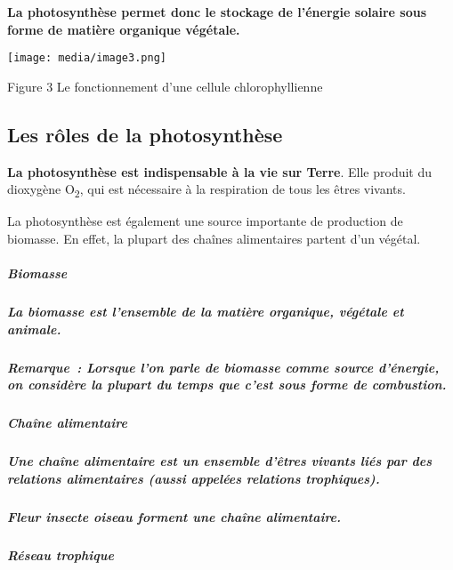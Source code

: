 \begin{itemize}
\textbf{La photosynthèse permet donc le stockage de l'énergie solaire
sous forme de matière organique végétale.}

\texttt{[image: media/image3.png]}

\protect\hypertarget{le-fonctionnement-dune-cellule-chlorophy}{}{}Figure
3 Le fonctionnement d'une cellule chlorophyllienne

\subsection{Les rôles de la
photosynthèse}\label{les-ruxf4les-de-la-photosynthuxe8se}

\textbf{La photosynthèse est indispensable à la vie sur Terre}. Elle
produit du dioxygène O\textsubscript{2}, qui est nécessaire à la
respiration de tous les êtres vivants.

La photosynthèse est également une source importante de production de
biomasse. En effet, la plupart des chaînes alimentaires partent d'un
végétal.

\subparagraph{\texorpdfstring{\textbf{Biomasse}}{Biomasse}}\label{biomasse}

\subparagraph{La biomasse est l'ensemble de la matière organique,
végétale et
animale.}\label{la-biomasse-est-lensemble-de-la-matiuxe8re-organique-vuxe9guxe9tale-et-animale.}

\subparagraph{}\label{section}

\subparagraph{Remarque~: Lorsque l'on parle de biomasse comme source
d'énergie, on considère la plupart du temps que c'est sous forme de
combustion.}\label{remarque-lorsque-lon-parle-de-biomasse-comme-source-duxe9nergie-on-considuxe8re-la-plupart-du-temps-que-cest-sous-forme-de-combustion.}

\subparagraph{\texorpdfstring{\textbf{Chaîne
alimentaire}}{Chaîne alimentaire}}\label{chauxeene-alimentaire}

\subparagraph{Une chaîne alimentaire est un ensemble d'êtres vivants
liés par des relations alimentaires (aussi appelées relations
trophiques).}\label{une-chauxeene-alimentaire-est-un-ensemble-duxeatres-vivants-liuxe9s-par-des-relations-alimentaires-aussi-appeluxe9es-relations-trophiques.}

\subparagraph{Fleur insecte oiseau forment une chaîne
alimentaire.}\label{fleur-insecte-oiseau-forment-une-chauxeene-alimentaire.}

\subparagraph{\texorpdfstring{\textbf{Réseau
trophique}}{Réseau trophique}}\label{ruxe9seau-trophique}


\end{itemize}
